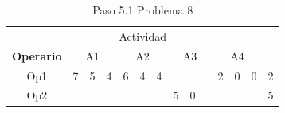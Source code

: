 \documentclass[12pt]{article}  %
\begin{document}
\begin{table}[H]
\centering
\caption{Paso 5.1 Problema 8}
\label{tab:Paso5.1.1Prob8}
\begin{tabular}{cccccccccccccc}
\multicolumn{14}{c}{Actividad}                                                                                                                                                                                                                                                                                                                                                                                                                                                                                                                                                                                                                                                                        \\ \cline{2-13}
\multicolumn{1}{c|}{\textbf{Operario}} & \multicolumn{3}{c|}{A1}                                                                                                                          & \multicolumn{3}{c|}{A2}                                                                                                                          & \multicolumn{3}{c|}{A3}                                                                                                                                                 & \multicolumn{3}{c|}{A4}                                                                                                                          & \multicolumn{1}{l}{}      \\ \cline{2-13}
\multicolumn{1}{c|}{Op1}               & \multicolumn{1}{c|}{\cellcolor[HTML]{67FD9A}7} & \multicolumn{1}{c|}{\cellcolor[HTML]{FFCC67}5} & \multicolumn{1}{c|}{\cellcolor[HTML]{FCFF2F}4} & \multicolumn{1}{c|}{\cellcolor[HTML]{67FD9A}6} & \multicolumn{1}{c|}{\cellcolor[HTML]{FFCC67}4} & \multicolumn{1}{c|}{\cellcolor[HTML]{F8FF00}4} & \multicolumn{1}{c|}{\cellcolor[HTML]{67FD9A}}  & \multicolumn{1}{c|}{\cellcolor[HTML]{FFCC67}}  & \multicolumn{1}{c|}{\cellcolor[HTML]{F8FF00}}                         & \multicolumn{1}{c|}{\cellcolor[HTML]{67FD9A}2} & \multicolumn{1}{c|}{\cellcolor[HTML]{FFC702}0} & \multicolumn{1}{c|}{\cellcolor[HTML]{F8FF00}0} & \cellcolor[HTML]{FFCCC9}2 \\ \cline{2-13}
\multicolumn{1}{c|}{Op2}               & \multicolumn{1}{c|}{\cellcolor[HTML]{67FD9A}}  & \multicolumn{1}{c|}{\cellcolor[HTML]{FFCC67}}  & \multicolumn{1}{c|}{\cellcolor[HTML]{FCFF2F}}  & \multicolumn{1}{c|}{\cellcolor[HTML]{67FD9A}}  & \multicolumn{1}{c|}{\cellcolor[HTML]{FFCC67}}  & \multicolumn{1}{c|}{\cellcolor[HTML]{F8FF00}}  & \multicolumn{1}{c|}{\cellcolor[HTML]{00D2CB}5} & \multicolumn{1}{c|}{\cellcolor[HTML]{00D2CB}0} & \multicolumn{1}{c|}{\cellcolor[HTML]{00D2CB}{\color[HTML]{FE0000} 0}} & \multicolumn{1}{c|}{\cellcolor[HTML]{67FD9A}}  & \multicolumn{1}{c|}{\cellcolor[HTML]{FFC702}}  & \multicolumn{1}{c|}{\cellcolor[HTML]{F8FF00}}  & \cellcolor[HTML]{FFCCC9}5 \\ \cline{2-13}

\end{tabular}
\end{table}
\end{document}
